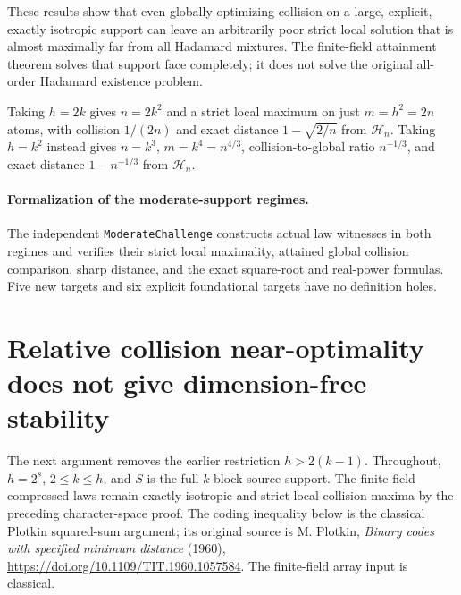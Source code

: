These results show that even globally optimizing collision on a large,
explicit, exactly isotropic support can leave an arbitrarily poor strict
local solution that is almost maximally far from all Hadamard mixtures.
The finite-field attainment theorem solves that support face completely;
it does not solve the original all-order Hadamard existence problem.

\begin{corollary}
\label{s25:cor:design-moderate-support}
Taking $h=2k$ gives $n=2k^2$ and a strict local maximum on just
$m=h^2=2n$ atoms, with collision $1/(2n)$ and exact distance
$1-\sqrt{2/n}$ from $\mathcal H_n$. Taking $h=k^2$ instead gives
$n=k^3$, $m=k^4=n^{4/3}$, collision-to-global ratio $n^{-1/3}$,
and exact distance $1-n^{-1/3}$ from $\mathcal H_n$.
\end{corollary}
\paragraph{Formalization of the moderate-support regimes.}
The independent \texttt{ModerateChallenge} constructs actual law witnesses
in both regimes and verifies their strict local maximality, attained global
collision comparison, sharp distance, and the exact square-root and real-power
formulas. Five new targets and six explicit foundational targets have no
definition holes.

\section{Relative collision near-optimality does not give dimension-free stability}
\label{s25:sec:design-relative-stability}
The next argument removes the earlier restriction $h>2(k-1)$.
Throughout, $h=2^s$, $2\le k\le h$, and $S$ is the full $k$-block source
support. The finite-field compressed laws remain exactly isotropic and
strict local collision maxima by the preceding character-space proof.
The coding inequality below is the classical Plotkin squared-sum argument;
its original source is M. Plotkin, \emph{Binary codes with specified
minimum distance} (1960), \url{https://doi.org/10.1109/TIT.1960.1057584}.
The finite-field array input is classical.

